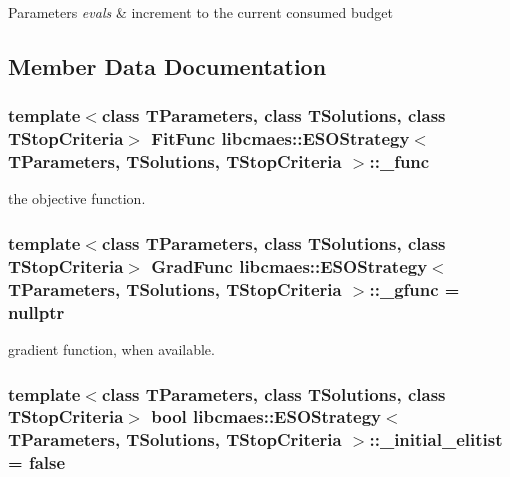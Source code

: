 \begin{DoxyParams}{Parameters}
{\em evals} & increment to the current consumed budget \\
\hline
\end{DoxyParams}


\subsection{Member Data Documentation}
\hypertarget{classlibcmaes_1_1ESOStrategy_a1a29d4c30bbdb6021920275e81fa4dc4}{
\subsubsection[{\-\_\-func}]{\setlength{\rightskip}{0pt plus 5cm}template$<$class T\-Parameters, class T\-Solutions, class T\-Stop\-Criteria$>$ Fit\-Func {\bf libcmaes\-::\-E\-S\-O\-Strategy}$<$ T\-Parameters, T\-Solutions, T\-Stop\-Criteria $>$\-::\-\_\-func\hspace{0.3cm}{\ttfamily [protected]}}}\label{classlibcmaes_1_1ESOStrategy_a1a29d4c30bbdb6021920275e81fa4dc4}
the objective function. \hypertarget{classlibcmaes_1_1ESOStrategy_a76926e49a2ca941a22362167bc230093}{
\subsubsection[{\-\_\-gfunc}]{\setlength{\rightskip}{0pt plus 5cm}template$<$class T\-Parameters, class T\-Solutions, class T\-Stop\-Criteria$>$ Grad\-Func {\bf libcmaes\-::\-E\-S\-O\-Strategy}$<$ T\-Parameters, T\-Solutions, T\-Stop\-Criteria $>$\-::\-\_\-gfunc = nullptr\hspace{0.3cm}{\ttfamily [protected]}}}\label{classlibcmaes_1_1ESOStrategy_a76926e49a2ca941a22362167bc230093}
gradient function, when available. \hypertarget{classlibcmaes_1_1ESOStrategy_a1ee27b35458c52501bebf5bdc42de385}{
\subsubsection[{\-\_\-initial\-\_\-elitist}]{\setlength{\rightskip}{0pt plus 5cm}template$<$class T\-Parameters, class T\-Solutions, class T\-Stop\-Criteria$>$ bool {\bf libcmaes\-::\-E\-S\-O\-Strategy}$<$ T\-Parameters, T\-Solutions, T\-Stop\-Criteria $>$\-::\-\_\-initial\-\_\-elitist = false\hspace{0.3cm}{\ttfamily [protected]}}}\label{classlibcmaes_1_1ESOStrategy_a1ee27b35458c52501bebf5bdc42de385}
